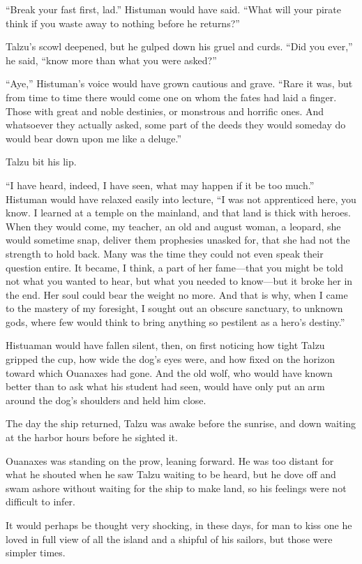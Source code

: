 ``Break your fast first, lad.'' Histuman would have said. ``What will your pirate think if you waste away to nothing before he returns?''

Talzu's scowl deepened, but he gulped down his gruel and curds. ``Did you ever,'' he said, ``know more than what you were asked?''

``Aye,'' Histuman's voice would have grown cautious and grave. ``Rare it was, but from time to time there would come one on whom the fates had laid a finger. Those with great and noble destinies, or monstrous and horrific ones. And whatsoever they actually asked, some part of the deeds they would someday do would bear down upon me like a deluge.''

Talzu bit his lip.

``I have heard, indeed, I have seen, what may happen if it be too much.'' Histuman would have relaxed easily into lecture, ``I was not apprenticed here, you know. I learned at a temple on the mainland, and that land is thick with heroes. When they would come, my teacher, an old and august woman, a leopard, she would sometime snap, deliver them prophesies unasked for, that she had not the strength to hold back. Many was the time they could not even speak their question entire. It became, I think, a part of her fame---that you might be told not what you wanted to hear, but what you needed to know---but it broke her in the end. Her soul could bear the weight no more. And that is why, when I came to the mastery of my foresight, I sought out an obscure sanctuary, to unknown gods, where few would think to bring anything so pestilent as a hero's destiny.''

Histuaman would have fallen silent, then, on first noticing how tight Talzu gripped the cup, how wide the dog's eyes were, and how fixed on the horizon toward which Ouanaxes had gone. And the old wolf, who would have known better than to ask what his student had seen, would have only put an arm around the dog's shoulders and held him close.

\secdiv

The day the ship returned, Talzu was awake before the sunrise, and down waiting at the harbor hours before he sighted it.

Ouanaxes was standing on the prow, leaning forward. He was too distant for what he shouted when he saw Talzu waiting to be heard, but he dove off and swam ashore without waiting for the ship to make land, so his feelings were not difficult to infer.

It would perhaps be thought very shocking, in these days, for man to kiss one he loved in full view of all the island and a shipful of his sailors, but those were simpler times.

